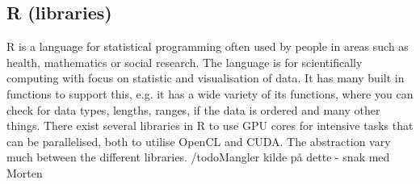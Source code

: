 \subsection{R (libraries)} %
R is a language for statistical programming often used by people in areas such as health, mathematics or social research.
The language is for scientifically computing with focus on statistic and visualisation of data.
It has many built in functions to support this, e.g. it has a wide variety of its functions, where you can check for data types, lengths, ranges, if the data is ordered and many other things.
There exist several libraries in R to use GPU cores for intensive tasks that can be parallelised, both to utilise OpenCL and CUDA. 
The abstraction vary much between the different libraries. /todo{Mangler kilde på dette - snak med Morten}
\citep{R_history,R_speed}

                            
